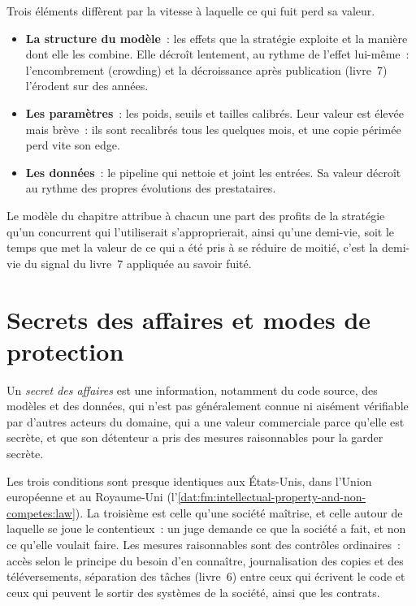 Trois éléments diffèrent par la vitesse à laquelle ce qui fuit perd sa valeur.
\begin{itemize}
\item \textbf{La structure du modèle}~: les effets que la stratégie exploite et la manière dont elle les combine. Elle décroît lentement, au rythme de l'effet
lui-même~: l'encombrement (crowding) et la décroissance après publication (livre~7) l'érodent sur des années.
\item \textbf{Les paramètres}~: les poids, seuils et tailles calibrés. Leur valeur est élevée mais brève~: ils sont recalibrés tous les quelques mois, et
une copie périmée perd vite son edge.
\item \textbf{Les données}~: le pipeline qui nettoie et joint les entrées. Sa valeur décroît au rythme des propres évolutions des prestataires.
\end{itemize}
Le modèle du chapitre attribue à chacun une part des profits de la stratégie qu'un concurrent qui l'utiliserait s'approprierait, ainsi qu'une demi-vie, soit le temps que met la valeur de
ce qui a été pris à se réduire de moitié, c'est la demi-vie du signal du livre~7 appliquée au savoir fuité.

\section{Secrets des affaires et modes de protection}

\begin{definition}\label{def:fm:intellectual-property-and-non-competes:secret}
Un \emph{secret des affaires} est une information, notamment du code source, des modèles et des données, qui n'est pas généralement connue ni aisément
vérifiable par d'autres acteurs du domaine, qui a une valeur commerciale parce qu'elle est secrète, et que son détenteur a pris des mesures
raisonnables pour la garder secrète.
\end{definition}

Les trois conditions sont presque identiques aux États-Unis, dans l'Union européenne et au Royaume-Uni (l'\cref{dat:fm:intellectual-property-and-non-competes:law}).
La troisième est celle qu'une société maîtrise, et celle autour de laquelle se joue le contentieux~: un juge demande ce que la société a fait, et non ce qu'elle voulait faire. Les mesures raisonnables
sont des contrôles ordinaires~: accès selon le principe du besoin d'en connaître, journalisation des copies et des téléversements, séparation des tâches (livre~6) entre ceux qui
écrivent le code et ceux qui peuvent le sortir des systèmes de la société, ainsi que les contrats.

